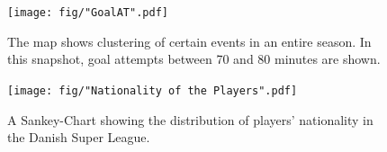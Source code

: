 \documentclass[portrait, a0,30pt]{sciposter}
\begin{document}
\begin{multicols}{2}
\begin{mdframed}
\begin{figure}
	\center
	\texttt{[image: fig/"GoalAT".pdf]}
	\label{Fig:viz}
	\caption{The map shows clustering of certain events in an entire season. In this snapshot, goal attempts between 70 and 80 minutes are shown.}
\end{figure}
\end{mdframed}

\begin{mdframed}
\begin{figure}
\center
\texttt{[image: fig/"Nationality of the Players".pdf]}
\label{Fig:Nationality}
\caption{A Sankey-Chart showing the distribution of players' nationality in the Danish Super League.
}
\end{figure}
\end{mdframed}

%






\end{multicols}
\end{document}
